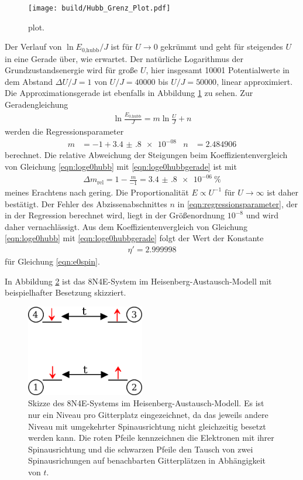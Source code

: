 \begin{figure}
  \centering
  \texttt{[image: build/Hubb\_Grenz\_Plot.pdf]}
  \caption{plot.}
  \label{fig:loglog}
\end{figure}

Der Verlauf von $\ln{E_\text{0,hubb}/J}$ ist für $U \to 0$ gekrümmt und geht für steigendes $U$ in eine Gerade über, wie erwartet.
Der natürliche Logarithmus der Grundzustandsenergie wird für große $U$, hier insgesamt 10001 Potentialwerte in dem Abstand $\Delta U/J = 1$ von $U/J = \num{40000}$ bis $U/J = \num{50000}$,
linear approximiert. Die Approximationsgerade ist ebenfalls in Abbildung \ref{fig:loglog} zu sehen. Zur Geradengleichung
\begin{align}
  \ln{\frac{E_\text{0,hubb}}{J}} = m \ln{\frac{U}{J}} + n
  \label{eqn:loge0hubbgerade}
\end{align}
werden die Regressionsparameter
\begin{align}
  m & = -1 + \num{3.4(8)e-08}  & n & = 2.484906
  \label{eqn:regressionsparameter}
\end{align}
berechnet. Die relative Abweichung der Steigungen beim Koeffizientenvergleich von Gleichung \eqref{eqn:loge0hubb} mit \eqref{eqn:loge0hubbgerade} ist mit
\begin{align}
  \Delta m_\text{rel} = 1- \frac{m}{-1} = \SI{3.4(8)e-06}{\percent}
\end{align}
meines Erachtens nach gering. Die Proportionalität $E \propto U^{-1}$ für $U \to \infty$ ist daher bestätigt.
Der Fehler des Abzissenabschnittes $n$ in \eqref{eqn:regressionsparameter}, der in der Regression berechnet wird, liegt in der Größenordnung $10^{-8}$ und wird daher vernachlässigt.
Aus dem Koeffizientenvergleich von Gleichung \eqref{eqn:loge0hubb} mit \eqref{eqn:loge0hubbgerade} folgt der Wert der Konstante
\begin{align}
  \eta' = 2.999998
  \label{eqn:eta1}
\end{align}
für Gleichung \eqref{eqn:e0spin}.

In Abbildung \ref{fig:spinsystem} ist das 8N4E-System im Heisenberg-Austausch-Modell mit beispielhafter Besetzung skizziert.

\begin{figure}
  \centering
  \includegraphics[height = 4cm]{Graphiken/heisenberg_system.pdf}
  \caption{Skizze des 8N4E-Systems im Heisenberg-Austausch-Modell. Es ist nur ein Niveau pro Gitterplatz eingezeichnet, da das jeweils andere Niveau mit umgekehrter Spinausrichtung nicht gleichzeitig besetzt werden kann.
  Die roten Pfeile kennzeichnen die Elektronen mit ihrer Spinausrichtung und die schwarzen Pfeile den Tausch von zwei Spinausrichungen auf benachbarten Gitterplätzen in Abhängigkeit von $t$.}
  \label{fig:spinsystem}
\end{figure}

